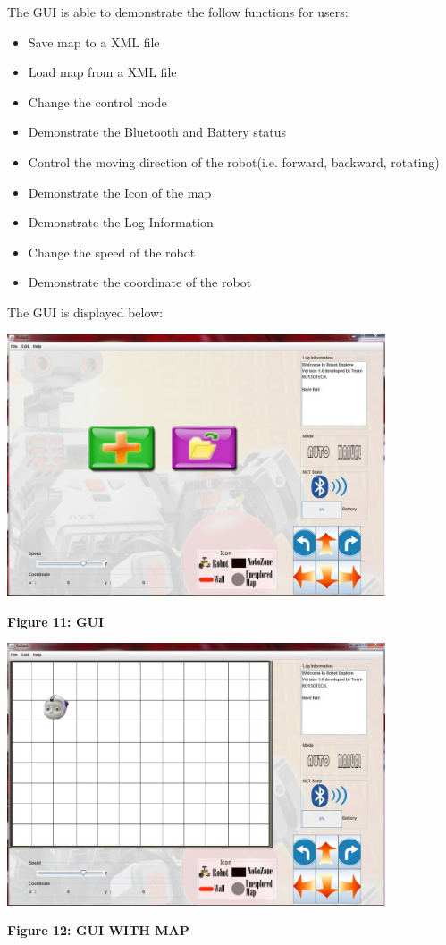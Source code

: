 \documentclass[11pt, a4paper]{report}
\begin{document}
The GUI is able to demonstrate the follow functions for users:
\begin{itemize}
\item Save map to a XML file
\item Load map from a XML file
\item Change the control mode
\item Demonstrate the Bluetooth and Battery status
\item Control the moving direction of the robot(i.e. forward, backward, rotating)
\item Demonstrate the Icon of the map
\item Demonstrate the Log Information
\item Change the speed of the robot
\item Demonstrate the coordinate of the robot
\end{itemize}
The GUI is displayed below:
\pagebreak
\begin{center}
 \includegraphics[width=11.20cm]{GUI.jpg}
\end{center}
\begin{center}
\textbf {Figure 11: GUI} \\[0.3cm]
\end{center}
\begin{center}
 \includegraphics[width=11.20cm]{GUI2.jpg}
\end{center}
\begin{center}
\textbf {Figure 12: GUI WITH MAP} \\[0.3cm]
\end{center}
\end{document}
